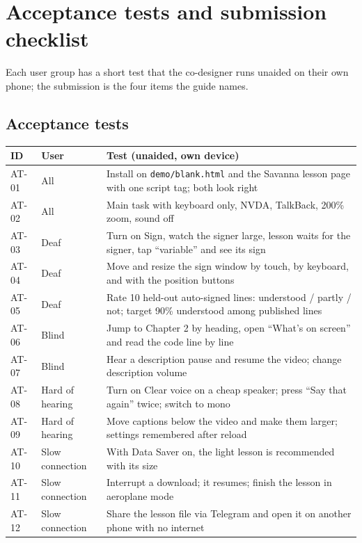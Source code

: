 \documentclass[11pt,a4paper]{article}
\newcommand{\code}[1]{\texttt{#1}}
\begin{document}
\section{Acceptance tests and submission checklist}

Each user group has a short test that the co-designer runs unaided on their own phone; the submission is the four items the guide names.

\subsection{Acceptance tests}
\begin{xltabular}{\textwidth}{@{}l >{\raggedright\arraybackslash}p{2.6cm} X@{}}
\toprule
\textbf{ID} & \textbf{User} & \textbf{Test (unaided, own device)} \\
\midrule
\endhead
AT-01 & All & Install on \code{demo/blank.html} and the Savanna lesson page with one script tag; both look right \\
AT-02 & All & Main task with keyboard only, NVDA, TalkBack, 200\% zoom, sound off \\
AT-03 & Deaf & Turn on Sign, watch the signer large, lesson waits for the signer, tap ``variable'' and see its sign \\
AT-04 & Deaf & Move and resize the sign window by touch, by keyboard, and with the position buttons \\
AT-05 & Deaf & Rate 10 held-out auto-signed lines: understood / partly / not; target 90\% understood among published lines \\
AT-06 & Blind & Jump to Chapter 2 by heading, open ``What's on screen'' and read the code line by line \\
AT-07 & Blind & Hear a description pause and resume the video; change description volume \\
AT-08 & Hard of hearing & Turn on Clear voice on a cheap speaker; press ``Say that again'' twice; switch to mono \\
AT-09 & Hard of hearing & Move captions below the video and make them larger; settings remembered after reload \\
AT-10 & Slow connection & With Data Saver on, the light lesson is recommended with its size \\
AT-11 & Slow connection & Interrupt a download; it resumes; finish the lesson in aeroplane mode \\
AT-12 & Slow connection & Share the lesson file via Telegram and open it on another phone with no internet \\

\end{xltabular}
\end{document}
